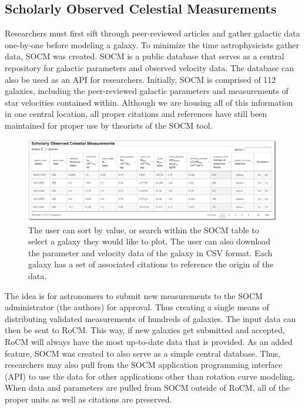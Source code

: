 \documentclass[conference]{IEEEtran-modified}
\begin{document}
\subsection{Scholarly Observed Celestial Measurements}
Researchers must first sift through peer-reviewed articles and gather galactic data one-by-one before modeling a galaxy. To minimize the time astrophysicists gather data, SOCM was created. SOCM is a public database that serves as a central repository for galactic parameters and observed velocity data. The database can also be used as an API for researchers. Initially, SOCM is comprised of 112 galaxies, including the peer-reviewed galactic parameters and measurements of star velocities contained within.  Although we are housing all of this information in one central location, all proper citations and references have still been maintained for proper use by theorists of the SOCM tool.
       

\begin{figure}[!h]
\centering
\includegraphics[width=\textwidth]{socmtable}
\caption{The user can sort by value, or search within the SOCM table to select a galaxy they would like to plot. The user can also download the parameter and velocity data of the galaxy in CSV format. Each galaxy has a set of associated citations to reference the origin of the data.}
\label{socm_fig}
\end{figure}



The idea is for astronomers to submit new measurements to the SOCM administrator (the authors) for approval. Thus creating a single means of distributing validated measurements of hundreds of galaxies. The input data can then be sent to RoCM. This way, if new galaxies get submitted and accepted, RoCM will always have the most up-to-date data that is provided. As an added feature, SOCM was created to also serve as a simple central database.  Thus, researchers may also pull from the SOCM application programming interface (API) to use the data for other applications other than rotation curve modeling.  When data and parameters are pulled from SOCM outside of RoCM, all of the proper units as well as citations are preserved.
\end{document}

